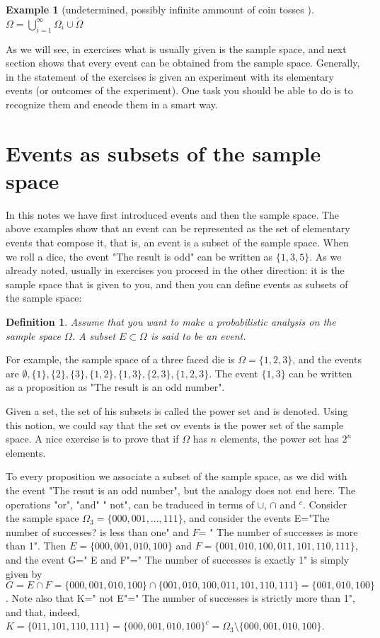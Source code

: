 \documentclass[reqno]{amsart}
\newtheorem{definition}[theorem]{Definition}
\newtheorem{example}[theorem]{Example}
\newcommand{\<}{{\langle \!\! \langle}}
\renewcommand{\>}{{\rangle \!\! \rangle}}
\newcommand{\commento}[1]{
	\par\noindent
	\colorbox{light}{\begin{minipage}{120 mm}#1\end{minipage}}
	\par\noindent
}
\begin{document}
\begin{example}[undetermined, possibly infinite ammount of coin tosses ]
$\Omega=\bigcup_{i=1}^\infty\Omega_i \cup \tilde{\Omega}$
\end{example}
As we will see, in exercises what is usually given is the sample space, and next section shows that every event can be obtained from the sample space.  
Generally, in the statement of the exercises is given an experiment with its elementary events (or outcomes of the experiment). One task you should be able to do is to recognize them and encode them in a smart way. \\

\section{ Events as subsets of the sample space }

In this notes we have first introduced events and then the sample space. The above examples show that an event can be represented as the set of elementary events that compose it, that is, an event is a subset of the sample space.
 When we roll a dice, the event "The result is odd"  can be written as $\{1,3,5\}$. 
 As we already noted, usually in exercises you proceed in the other direction: it is the sample space that is given to you, and then you can define events as subsets of the sample space:    


\begin{definition}
Assume that you want to make a probabilistic analysis on the sample space $\Omega$. A subset $E\subset \Omega$ is said to be an event. 
\end{definition}

For example, the sample space of a three faced die is $\Omega = \{1,2,3\}$, and the events are $\emptyset, \{1\}, \{2\}, \{3\}, \{1,2\}, \{1,3\}, \{2,3\}, \{1,2,3\}$. The event $\{1,3\}$ can be written as a proposition as "The result is an odd number".
\commento{ Given a set, the set of his subsets is called the power set and is denoted. Using this notion, we could say that the set ov events is the power set of the sample space. A nice exercise is to prove that if $\Omega$ has $n$ elements, the power set has $2^n$ elements.}
 
To every proposition we associate a subset of the sample space, as we did with the event "The resut is an odd number", but the analogy does not end here. The operations "or", "and" " not", can be traduced in terms of $\cup$, $\cap$ and $^c$. Consider the sample space $\Omega_3=\{000,001,...,111\}$, and consider the events E="The number of successes? is less than one" and $F$= " The number of successes is more than 1". Then $E=\{000,001,010,100\}$ and $F = \{001,010,100,011,101,110,111\}$, and the event G=" E and F"=" The number of successes is exactly 1" is simply given by $G=E\cap F= \{000,001,010,100\}\cap \{001,010,100,011,101,110,111\}=\{001,010,100\}$. Note also that K=" not E"=" The number of successes is strictly more than 1", and that, indeed, $K=\{011,101,110,111\}=\{000,001,010,100\}^c=\Omega_3\setminus \{000,001,010,100\}$.     
\end{document}
